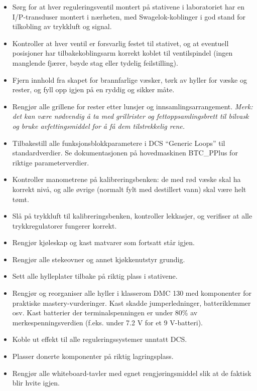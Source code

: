\begin{itemize}
\item{} \underbar{\hskip 50pt} Sørg for at hver reguleringsventil montert på stativene i laboratoriet har en I/P-transduser montert i nærheten, med Swagelok-koblinger i god stand for tilkobling av trykkluft og signal.
\item{} \underbar{\hskip 50pt} Kontroller at hver ventil er forsvarlig festet til stativet, og at eventuell posisjoner har tilbakekoblingsarm korrekt koblet til ventilspindel (ingen manglende fjærer, bøyde stag eller tydelig feilstilling).
\item{} \underbar{\hskip 50pt} Fjern innhold fra skapet for brannfarlige væsker, tørk av hyller for væske og rester, og fyll opp igjen på en ryddig og sikker måte.
\item{} \underbar{\hskip 50pt} Rengjør alle grillene for rester etter lunsjer og innsamlingsarrangement. {\it Merk: det kan være nødvendig å ta med grillrister og fettoppsamlingsbrett til bilvask og bruke avfettingsmiddel for å få dem tilstrekkelig rene.}
\item{} \underbar{\hskip 50pt} Tilbakestill alle funksjonsblokkparametere i DCS ``Generic Loops'' til standardverdier. Se dokumentasjonen på hovedmaskinen BTC\_PPlus for riktige parameterverdier.
\item{} \underbar{\hskip 50pt} Kontroller manometrene på kalibreringsbenken: de med rød væske skal ha korrekt nivå, og alle øvrige (normalt fylt med destillert vann) skal være helt tømt.
\item{} \underbar{\hskip 50pt} Slå på trykkluft til kalibreringsbenken, kontroller lekkasjer, og verifiser at alle trykkregulatorer fungerer korrekt.
\item{} \underbar{\hskip 50pt} Rengjør kjøleskap og kast matvarer som fortsatt står igjen.
\item{} \underbar{\hskip 50pt} Rengjør alle stekeovner og annet kjøkkenutstyr grundig.
\item{} \underbar{\hskip 50pt} Sett alle hylleplater tilbake på riktig plass i stativene.
\item{} \underbar{\hskip 50pt} Rengjør og reorganiser alle hyller i klasserom DMC 130 med komponenter for praktiske mastery-vurderinger. Kast skadde jumperledninger, batteriklemmer osv. Kast batterier der terminalspenningen er under 80\% av merkespenningsverdien (f.eks. under 7.2 V for et 9 V-batteri).
\item{} \underbar{\hskip 50pt} Koble ut effekt til alle reguleringssystemer unntatt DCS.
\item{} \underbar{\hskip 50pt} Plasser donerte komponenter på riktig lagringsplass.
\item{} \underbar{\hskip 50pt} Rengjør alle whiteboard-tavler med egnet rengjøringsmiddel slik at de faktisk blir hvite igjen.
\end{itemize}


